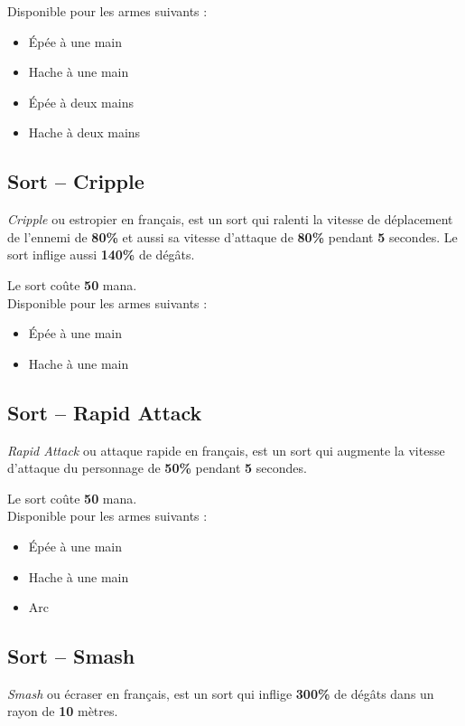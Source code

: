 \documentclass[11pt, a4paper, oneside]{report}
\begin{document}
Disponible pour les armes suivants :
\begin{multicols}{2}
\begin{itemize}
    \item Épée à une main
    \item Hache à une main
    \item Épée à deux mains
    \item Hache à deux mains
\end{itemize}
\end{multicols}
\subsection{Sort -- Cripple}
\emph{Cripple} ou estropier en français, est un sort qui ralenti la vitesse de déplacement de l'ennemi de \textbf{80\%} et aussi sa vitesse d'attaque de \textbf{80\%} pendant \textbf{5} secondes. Le sort inflige aussi \textbf{140\%} de dégâts.

Le sort coûte \textbf{50} mana.\\

Disponible pour les armes suivants :
\begin{multicols}{2}
\begin{itemize}
    \item Épée à une main
    \item Hache à une main
\end{itemize}
\end{multicols}
\subsection{Sort -- Rapid Attack}
\emph{Rapid Attack} ou attaque rapide en français, est un sort qui augmente la vitesse d'attaque du personnage de \textbf{50\%} pendant \textbf{5} secondes.

Le sort coûte \textbf{50} mana.\\

Disponible pour les armes suivants :
\begin{multicols}{2}
\begin{itemize}
    \item Épée à une main
    \item Hache à une main
    \item Arc
\end{itemize}
\end{multicols}
\subsection{Sort -- Smash}
\emph{Smash} ou écraser en français, est un sort qui inflige \textbf{300\%} de dégâts dans un rayon de \textbf{10} mètres.
\end{document}
